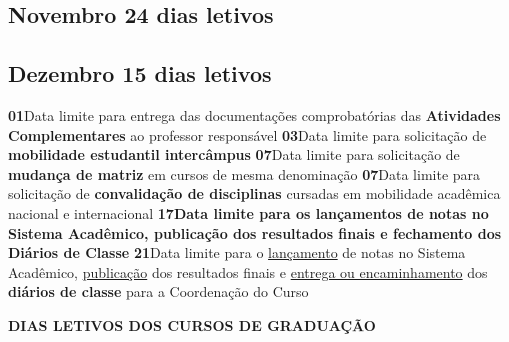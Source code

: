 \documentclass[thesis]{hmcposter}
\begin{document}
\begin{poster}
\subsection{Novembro \hfill 24 dias letivos}\subsection{Dezembro \hfill 15 dias letivos}\textbf{01}\qquad Data limite para entrega das documentações comprobatórias das \textbf{Atividades Complementares} ao professor responsável \newline \null\textbf{03}\qquad Data limite para solicitação de \textbf{mobilidade estudantil intercâmpus} \newline \null\textbf{07}\qquad Data limite para solicitação de \textbf{mudança de matriz} em cursos de mesma denominação \newline \null\textbf{07}\qquad Data limite para solicitação de \textbf{convalidação de disciplinas} cursadas em mobilidade acadêmica nacional e internacional \newline \null\textbf{17}\qquad \textbf{Data limite para os lançamentos de notas no Sistema Acadêmico, publicação dos resultados finais e fechamento dos Diários de Classe} \newline \null\textbf{21}\qquad Data limite para o \underline{lançamento} de notas no Sistema Acadêmico, \underline{publicação} dos resultados finais e \underline{entrega ou encaminhamento} dos \textbf{diários de classe} para a Coordenação do Curso \newline \null\newpage
~
\vfill
\begin{center}
\large \textbf{DIAS LETIVOS DOS CURSOS DE GRADUAÇÃO}
\newline
\null
\newline
\begin{table}
\centering
{}
\end{table}

\end{center}
\end{poster}
\end{document}
